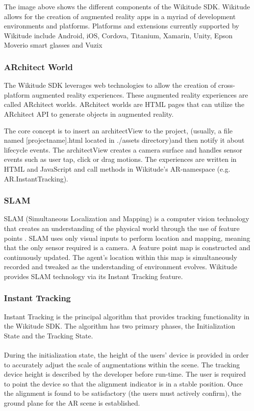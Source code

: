 The image above shows the different components of the Wikitude SDK. Wikitude allows for the creation of augmented reality apps in a myriad of development environments and platforms. Platforms and extensions currently supported by Wikitude include Android, iOS,  Cordova, Titanium, Xamarin, Unity, Epson Moverio smart glasses and Vuzix

\subsubsection{ARchitect World}
The Wikitude SDK leverages web technologies to allow the creation of cross-platform augmented reality experiences. These augmented reality experiences are called ARchitect worlds. ARchitect worlds are HTML pages that can utilize the ARchitect API to generate objects in augmented reality.

The core concept is to insert an architectView to the project, (usually, a file named [projectname].html located in ./assets directory)and then notify it about lifecycle events. The architectView creates a camera surface and handles sensor events such as user tap, click or drag motions. The experiences are written in HTML and JavaScript and call methods in Wikitude's AR-namespace (e.g. AR.InstantTracking).

\subsubsection{SLAM}
SLAM (Simultaneous Localization and Mapping) is a computer vision technology that creates an understanding of the physical world through the use of feature points \cite{slam}. SLAM uses only visual inputs to perform location and mapping, meaning that the only sensor required is a camera. A feature point map is constructed and continuously updated. The agent’s location within this map is simultaneously recorded and tweaked as the understanding of environment evolves.  Wikitude provides SLAM technology via its Instant Tracking feature.

\subsubsection{Instant Tracking}
Instant Tracking is the principal algorithm that provides tracking functionality in the Wikitude SDK. The algorithm has two primary phases, the Initialization State and the Tracking State. 
\\ \\
During the initialization state, the height of the users’ device is provided in order to accurately adjust the scale of augmentations within the scene.  The tracking device height is described by the developer before run-time. The user is required to point the device so that the alignment indicator is in a stable position. Once the alignment is found to be satisfactory (the users must actively confirm), the ground plane for the AR scene is established. 

